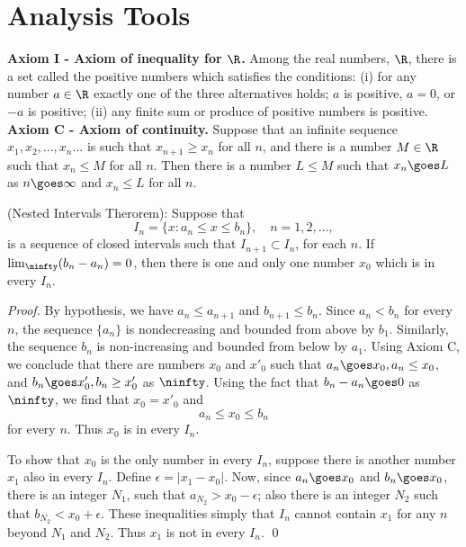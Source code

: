 \section{Analysis Tools}

{\bf Axiom I - Axiom of inequality for $\R$. } Among the real numbers, $\R$, there is a set called the positive numbers which satisfies the conditions: (i) for any number $a\in \R$ exactly one of the three alternatives holds; $a$ is positive, $a = 0$, or $-a$ is positive; (ii) any finite sum or produce of positive numbers is positive. \\

{\bf Axiom C - Axiom of continuity. }  Suppose that an infinite sequence $x_1, x_2, \hdots, x_n\hdots $ is such that $x_{n+1} \ge x_n$ for all $n$, and there is a number $M\in \R$ such that $x_n \le M$ for all $n$. Then there is a number $L\le M$ such that $x_n\goes L$ as $n\goes\infty$ and $x_n\le L$ for all $n$. \\


\begin{theorem}{(Nested Intervals Therorem):}
Suppose that
\[ I_n = \{ x: a_n \le x \le b_n\}, \quad n=1,2,...,\]
is a sequence of closed intervals such that $I_{n+1} \subset I_n$, for each $n$. If $\lim_{\ninfty}(b_n - a_n) = 0$, then there is one and only one number $x_0$ which is in every $I_n$.
\end{theorem}

\begin{proof}
By hypothesis, we have $a_n \le a_{n+1}$ and $b_{n+1} \le b_n$. Since $a_n < b_n$ for every $n$, the sequence $\{a_n\}$ is nondecreasing and bounded from above by $b_1$. Similarly, the
sequence $b_n $ is non-increasing and bounded from below by $a_1$. Using Axiom C, we conclude that there are numbers $x_0$ and $x'_0$ such that $a_n \goes x_0, a_n\le x_0$, and
$b_n \goes x'_0, b_n\ge x'_0$ as $\ninfty$. Using the fact that $b_n - a_n \goes 0$ as $\ninfty$, we find that $x_0 = x'_0$ and
\[ a_n \le x_0 \le b_n\] for every $n$. Thus $x_0$ is in every $I_n$.

To show that $x_0$ is the only number in every $I_n$, suppose there is another number $x_1$ also in every $I_n$. Define $\epsilon = | x_1 - x_0|$. Now, since $a_n\goes x_0$ and $b_n\goes x_0$, there is an integer $N_1$, such that $a_{N_2} > x_0 - \epsilon$; also there is an integer $N_2$ such that $b_{N_2} < x_0 + \epsilon$. These inequalities simply that $I_n$ cannot contain $x_1$ for any $n$ beyond $N_1$ and $N_2$. Thus $x_1$ is not in every $I_n$. \qed
\end{proof}

